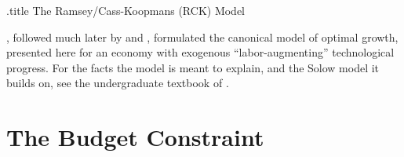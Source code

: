 \documentclass{econark}
\begin{document}
\handoutHeader

\begin{verbatimwrite}{\jobname.title}
  The Ramsey/Cass-Koopmans (RCK) Model
\end{verbatimwrite}

\handoutNameMake



\citet{ramseySave}, followed much later by \citet{cass:growth} and \citet{koopmans:growth}, formulated the canonical model of optimal growth, presented here for an economy with exogenous ``labor-augmenting'' technological progress. For the facts the model is meant to explain, and the Solow model it builds on, see the undergraduate textbook of \citet{ashrafWeilGrowth}.

\section{The Budget Constraint}
\end{document}

